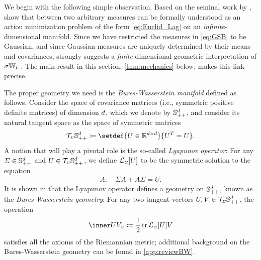 \label{sec:actionBW}


 We begin with the following simple observation. Based on the seminal work by \citet{otto2001geometry}, \citet{gentil2020dynamical} show that  between two arbitrary measures can be formally understood as an action minimization problem of the form \eqref{eq:Euclid_Lag} on an \emph{infinite}-dimensional manifold. Since we have restricted the measures in \eqref{eq:GSB} to be Gaussian, and since Gaussian measures are uniquely determined by their means and covariances, \citet{gentil2020dynamical} strongly suggests a \emph{finite}-dimensional geometric interpretation of $\sigma\mathbb{W}_{t}$-. The main result in this section, \cref{thm:mechanics} below, makes this link precise.

The proper geometry we need is the \emph{Bures-Wasserstein manifold} \citep{takatsu2010wasserstein, bhatia2019bures} defined as follows. Consider the space of covariance matrices (i.e., symmetric positive definite matrices) of dimension $d$, which we denote by $\mathbb{S}_{++}^d$, and consider its natural {tangent space} as the space of symmetric matrices
\begin{equation}
\mathcal{T}_{\ssstyle \Sigma} \SPD \defeq \setdef{U \in \R^{\vdim\times\vdim}}{ U^T  = U}.
\end{equation}
A notion that will play a pivotal role is the so-called \emph{Lyapunov operator}: For any $\Sigma \in \mathbb{S}_{++}^d$ and $U\in\mathcal{T}_{\scriptscriptstyle \Sigma}\mathbb{S}_{++}^d$, we define $\lyap[\Sigma][U]$ to be the symmetric solution to the equation
\begin{align}
\label{eq:lya}
A: \quad \Sigma A  + A \Sigma = U.
\end{align}
It is shown in \citet{takatsu2010wasserstein} that the Lyapunov operator defines a geometry on $\mathbb{S}_{++}^d$, known as the \emph{Bures-Wasserstein geometry}: For any two tangent vectors $U, V\in \mathcal{T}_{\scriptscriptstyle \Sigma}\mathbb{S}_{++}^d$, the operation
\begin{align}
\label{eq:BW-tensorMain}
\innerBW[U][V][\Sigma] \defeq %
\frac{1}{2}\tr \lyap[\Sigma][U]V%
\end{align}satisfies all the axioms of the Riemannian metric; additional background on the Bures-Wasserstein geometry can be found in \cref{app:reviewBW}. 


